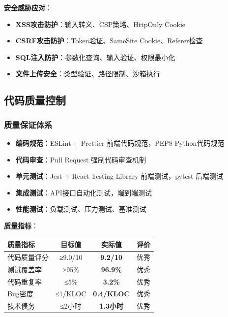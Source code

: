 \documentclass[12pt,a4paper]{article}
\begin{document}
\textbf{安全威胁应对}：
\begin{itemize}
    \item \textbf{XSS攻击防护}：输入转义、CSP策略、HttpOnly Cookie
    \item \textbf{CSRF攻击防护}：Token验证、SameSite Cookie、Referer检查
    \item \textbf{SQL注入防护}：参数化查询、输入验证、权限最小化
    \item \textbf{文件上传安全}：类型验证、路径限制、沙箱执行
\end{itemize}

\subsection{代码质量控制}

\subsubsection{质量保证体系}

\begin{successbox}[title={代码质量控制流程}]
\begin{itemize}[nosep]
    \item \textbf{编码规范}：ESLint + Prettier 前端代码规范，PEP8 Python代码规范
    \item \textbf{代码审查}：Pull Request 强制代码审查机制
    \item \textbf{单元测试}：Jest + React Testing Library 前端测试，pytest 后端测试
    \item \textbf{集成测试}：API接口自动化测试，端到端测试
    \item \textbf{性能测试}：负载测试、压力测试、基准测试
\end{itemize}
\end{successbox}

\textbf{质量指标}：
\begin{table}[H]
\centering
\begin{tcolorbox}[
    colback=light,
    colframe=warning,
    title={\textbf{代码质量评估指标}},
    coltitle=white,
    colbacktitle=warning,
    fonttitle=\bfseries,
    rounded corners=5pt,
    width=0.85\textwidth
]
\begin{tabular}{lccc}
\toprule
\rowcolor{warning!20}
\textbf{质量指标} & \textbf{目标值} & \textbf{实际值} & \textbf{评价} \\
\midrule
代码质量评分 & ≥9.0/10 & \textcolor{success}{\textbf{9.2/10}} & 优秀 \\
\rowcolor{light}
测试覆盖率 & ≥95\% & \textcolor{success}{\textbf{96.9\%}} & 优秀 \\
代码重复率 & ≤5\% & \textcolor{success}{\textbf{3.2\%}} & 优秀 \\
\rowcolor{light}
Bug密度 & ≤1/KLOC & \textcolor{success}{\textbf{0.4/KLOC}} & 优秀 \\
技术债务 & ≤2小时 & \textcolor{success}{\textbf{1.3小时}} & 优秀 \\
\bottomrule
\end{tabular}
\end{tcolorbox}
\end{table}
\end{document}
